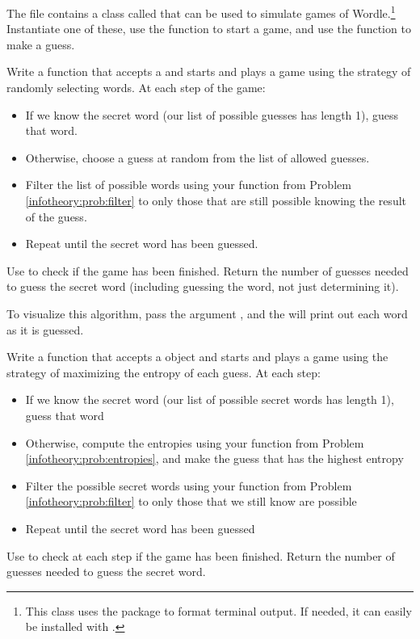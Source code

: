 \begin{problem}\label{problem:benchmark_algorithm}
	The file  contains a class called  that can be used to simulate games of Wordle.\footnote{This class uses the  package to format terminal output. If needed, it can easily be installed with .}
	Instantiate one of these, use the  function to start a game, and use the  function to make a guess.

	Write a function that accepts a  and starts and plays a game using the strategy of randomly selecting words.
	At each step of the game:
	\begin{itemize}
		\item If we know the secret word (our list of possible guesses has length 1), guess that word.
		\item Otherwise, choose a guess at random from the list of allowed guesses.
		\item Filter the list of possible words using your function from Problem \ref{infotheory:prob:filter} to only those that are still possible knowing the result of the guess.
		\item Repeat until the secret word has been guessed.
	\end{itemize}
	Use  to check if the game has been finished.
	Return the number of guesses needed to guess the secret word (including guessing the word, not just determining it).
	
	To visualize this algorithm, pass the argument , and the  will print out each word as it is guessed.
\end{problem}

\begin{problem}\label{problem:wordle_algorithm}
	Write a function that accepts a  object and starts and plays a game using the strategy of maximizing the entropy of each guess.
	At each step:
	\begin{itemize}
		\item If we know the secret word (our list of possible secret words has length 1), guess that word
		\item Otherwise, compute the entropies using your function from Problem \ref{infotheory:prob:entropies}, and make the guess that has the highest entropy
		\item Filter the possible secret words using your function from Problem \ref{infotheory:prob:filter} to only those that we still know are possible
		\item Repeat until the secret word has been guessed
	\end{itemize}
	Use  to check at each step if the game has been finished.
	Return the number of guesses needed to guess the secret word.
\end{problem}

